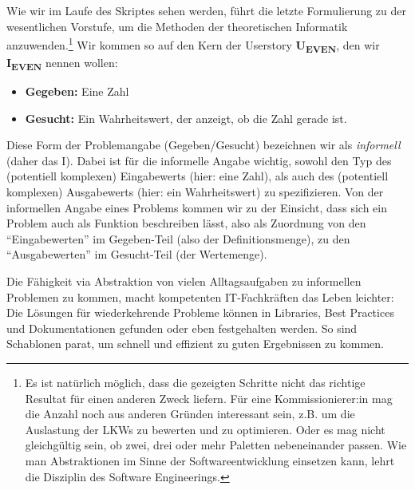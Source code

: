 Wie wir im Laufe des Skriptes sehen werden,
führt die letzte Formulierung zu der wesentlichen Vorstufe,
um die Methoden der theoretischen Informatik anzuwenden.\footnote{
Es ist natürlich möglich,
dass die gezeigten Schritte nicht das richtige Resultat für einen anderen Zweck liefern.
Für eine Kommissionierer:in mag die Anzahl noch aus anderen Gründen interessant sein,
z.B. um die Auslastung der LKWs zu bewerten und zu optimieren.
Oder es mag nicht gleichgültig sein, ob zwei, drei oder mehr Paletten nebeneinander passen.
Wie man Abstraktionen im Sinne der Softwareentwicklung einsetzen kann,
lehrt die Disziplin des Software Engineerings.}
Wir kommen so auf den Kern der Userstory \textbf{U\textsubscript{EVEN}},
den wir \textbf{I\textsubscript{EVEN}} nennen wollen:
\begin{itemize}
    \item \textbf{Gegeben:} Eine Zahl
    \item \textbf{Gesucht:} Ein Wahrheitswert, der anzeigt, ob die Zahl gerade ist.
\end{itemize}
Diese Form der Problemangabe (Gegeben/Gesucht) bezeichnen wir als \emph{informell}
(daher das I).
Dabei ist für die informelle Angabe wichtig,
sowohl den Typ des (potentiell komplexen) Eingabewerts (hier: eine Zahl),
als auch des (potentiell komplexen) Ausgabewerts (hier: ein Wahrheitswert) zu spezifizieren.
Von der informellen Angabe eines Problems kommen wir zu der Einsicht,
dass sich ein Problem auch als Funktion beschreiben lässt,
also als Zuordnung von den ``Eingabewerten'' im Gegeben-Teil
(also der Definitionsmenge),
zu den ``Ausgabewerten'' im Gesucht-Teil
(der Wertemenge).

Die Fähigkeit via Abstraktion von vielen Alltagsaufgaben zu informellen Problemen zu kommen,
macht kompetenten IT-Fachkräften das Leben leichter:
Die Lösungen für wiederkehrende Probleme können
in Libraries, Best Practices und Dokumentationen gefunden oder eben festgehalten werden.
So sind Schablonen parat,
um schnell und effizient zu guten Ergebnissen zu kommen.

